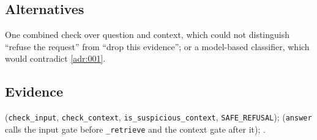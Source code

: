 \subsection*{Alternatives}

One combined check over question and context, which could not distinguish
``refuse the request'' from ``drop this evidence''; or a model-based classifier,
which would contradict \cref{adr:001}.

\subsection*{Evidence}

(\texttt{check\_input}, \texttt{check\_context},
\texttt{is\_suspicious\_context}, \texttt{SAFE\_REFUSAL});
(\texttt{answer} calls the input gate before \texttt{\_retrieve} and the
context gate after it); .
